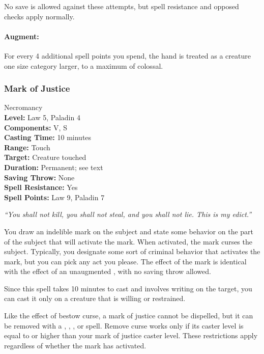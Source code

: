 No save is allowed against these attempts, but spell resistance and opposed checks apply normally.

\paragraph{Augment:}
For every 4 additional spell points you spend, the hand is treated as a creature one size category larger, to a maximum of colossal.

\subsubsection{Mark of Justice}
\label{Spell:MarkOfJustice}
Necromancy
\\ \textbf{Level:} Law 5, Paladin 4
\\ \textbf{Components:} V, S
\\ \textbf{Casting Time:} 10 minutes
\\ \textbf{Range:} Touch
\\ \textbf{Target:} Creature touched
\\ \textbf{Duration:} Permanent; see text
\\ \textbf{Saving Throw:} None
\\ \textbf{Spell Resistance:} Yes
\\ \textbf{Spell Points:} Law 9, Paladin 7

\emph{``You shall not kill, you shall not steal, and you shall not lie. This is my edict.''}

You draw an indelible mark on the subject and state some behavior on the part of the subject that will activate the mark. 
When activated, the mark curses the subject. 
Typically, you designate some sort of criminal behavior that activates the mark, but you can pick any act you please. 
The effect of the mark is identical with the effect of an unaugmented , with no saving throw allowed.

Since this spell takes 10 minutes to cast and involves writing on the target, 
you can cast it only on a creature that is willing or restrained.

Like the effect of bestow curse, a mark of justice cannot be dispelled, but it can be removed with a 
, , , or  spell. 
Remove curse works only if its caster level is equal to or higher than your mark of justice caster level. 
These restrictions apply regardless of whether the mark has activated.

